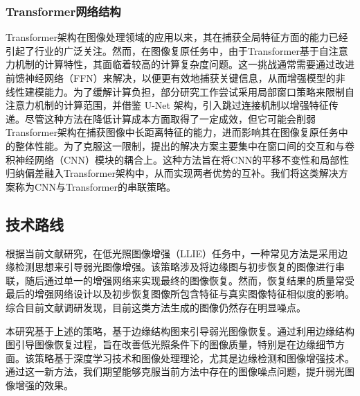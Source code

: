 \documentclass[a4paper]{ctexart}
\begin{document}
	\subsubsection{Transformer网络结构}
	
	Transformer架构\cite{vaswani2017attention}在图像处理领域的应用以来\cite{dosovitskiy2020image}，其在捕获全局特征方面的能力已经引起了行业的广泛关注。然而，在图像复原任务中，由于Transformer基于自注意力机制的计算特性，其面临着较高的计算复杂度问题。这一挑战通常需要通过改进前馈神经网络（FFN）来解决，以便更有效地捕获关键信息，从而增强模型的非线性建模能力\cite{wang2022ultrahighdefinition}。为了缓解计算负担，部分研究工作尝试采用局部窗口策略来限制自注意力机制的计算范围，并借鉴 U-Net 架构，引入跳过连接机制以增强特征传递\cite{wang2021uformer}。尽管这种方法在降低计算成本方面取得了一定成效，但它可能会削弱Transformer架构在捕获图像中长距离特征的能力，进而影响其在图像复原任务中的整体性能。为了克服这一限制，提出的解决方案\cite{chen2023cross}主要集中在窗口间的交互和与卷积神经网络（CNN）模块的耦合上。这种方法旨在将CNN的平移不变性和局部性归纳偏差融入Transformer架构中，从而实现两者优势的互补。我们将这类解决方案称为CNN与Transformer的串联策略。
	
	\subsection{技术路线}

	根据当前文献研究，在低光照图像增强（LLIE）任务中，一种常见方法是采用边缘检测思想来引导弱光图像增强。该策略涉及将边缘图与初步恢复的图像进行串联，随后通过单一的增强网络来实现最终的图像恢复。然而，恢复结果的质量常受最后的增强网络设计以及初步恢复图像所包含特征与真实图像特征相似度的影响。综合目前文献调研发现，目前这类方法生成的图像仍然存在明显噪点。
	
	本研究基于上述的策略，基于边缘结构图来引导弱光图像恢复。通过利用边缘结构图引导图像恢复过程，旨在改善低光照条件下的图像质量，特别是在边缘细节方面。该策略基于深度学习技术和图像处理理论，尤其是边缘检测和图像增强技术。通过这一新方法，我们期望能够克服当前方法中存在的图像噪点问题，提升弱光图像增强的效果。
	
\end{document}
